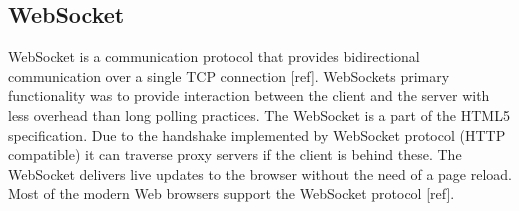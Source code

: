 \subsection{WebSocket}
\label{subsec:websocket}
WebSocket is a communication protocol that provides bidirectional communication over a single TCP connection [ref]. WebSockets primary functionality was to provide interaction between the client and the server with less overhead than long polling practices. The WebSocket is a part of the HTML5 specification. Due to the handshake implemented by WebSocket protocol (HTTP compatible) it can traverse proxy servers if the client is behind these. The WebSocket delivers live updates to the browser without the need of a page reload. Most of the modern Web browsers support the WebSocket protocol [ref].

